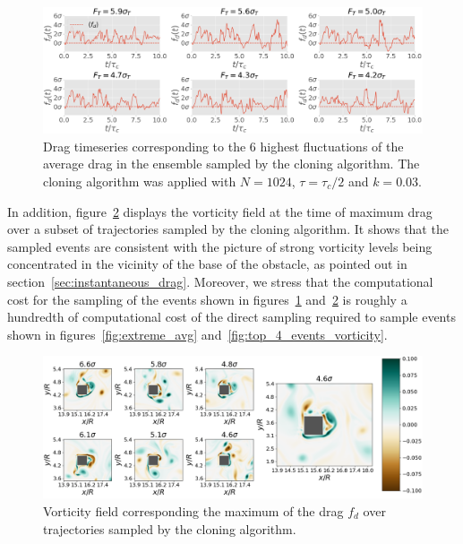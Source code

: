 \documentclass{jfm}
\begin{document}
\begin{figure}
  \centering
  \includegraphics[width=\linewidth]{timeseries_extrms_AVG_GKTL/timeseries_extrms_AVG_GKTL}
  \caption{Drag timeseries corresponding to the 6 highest fluctuations of the average drag in the ensemble sampled by the cloning algorithm. The cloning algorithm was applied with $N = 1024$, $\tau = \tau_c / 2$ and $k = 0.03$. }
  \label{fig:timeseries_extrms_AVG_GKTL}
\end{figure}

In addition, figure~\ref{fig:illustr_extrms_vorticity_GKTL} displays the vorticity field at the time of maximum drag over a subset of trajectories
sampled by the cloning algorithm.
It shows that the sampled events are consistent with the picture of strong vorticity levels being concentrated in the vicinity of the base of the obstacle, as pointed out in section~\ref{sec:instantaneous_drag}. 
Moreover, we stress that the computational cost for the sampling of the events shown in figures~\ref{fig:timeseries_extrms_AVG_GKTL} and~\ref{fig:illustr_extrms_vorticity_GKTL} is roughly a hundredth of computational cost of the direct sampling required to sample events shown in figures~\ref{fig:extreme_avg} and~\ref{fig:top_4_events_vorticity}.

\begin{figure}
  \centering
  \includegraphics[width=\linewidth]{illustr_extrms_vorticity_GKTL/illustr_extrms_vorticity_GKTL}
  \caption{Vorticity field corresponding the maximum of the drag $f_d$ over trajectories sampled by the cloning algorithm.}
  \label{fig:illustr_extrms_vorticity_GKTL}
\end{figure}
\end{document}
